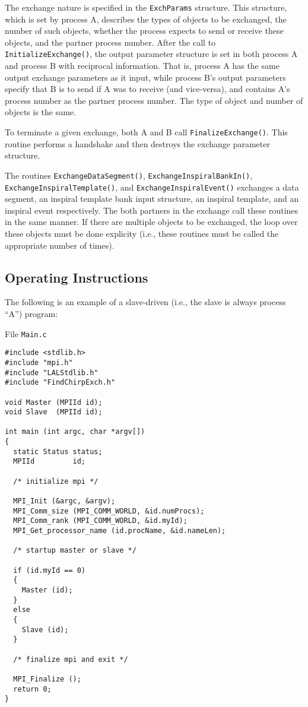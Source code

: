 \documentclass{article}
\begin{document}
The exchange nature is specified in the \verb+ExchParams+ structure.  This
structure, which is set by process A, describes the types of objects to be
exchanged, the number of such objects, whether the process expects to send or
receive these objects, and the partner process number.  After the call to
\verb+InitializeExchange()+, the output parameter structure is set in both
process A and process B with reciprocal information.  That is, process A has
the same output exchange parameters as it input, while process B's output
parameters specify that B is to send if A was to receive (and vice-versa), and
contains A's process number as the partner process number.  The type of object
and number of objects is the same.

To terminate a given exchange, both A and B call \verb+FinalizeExchange()+.
This routine performs a handshake and then destroys the exchange parameter
structure.

The routines \verb+ExchangeDataSegment()+, \verb+ExchangeInspiralBankIn()+,
\verb+ExchangeInspiralTemplate()+, and \verb+ExchangeInspiralEvent()+
exchanges a data segment, an inspiral template bank input structure, an
inspiral template, and an inspiral event respectively.  The both partners in
the exchange call these routines in the same manner.  If there are multiple
objects to be exchanged, the loop over these objects must be done explicity
(i.e., these routines must be called the appropriate number of times).


\subsection{Operating Instructions}

The following is an example of a slave-driven (i.e., the slave is always
process ``A'') program:

File \verb+Main.c+
\begin{verbatim}
#include <stdlib.h>
#include "mpi.h"
#include "LALStdlib.h"
#include "FindChirpExch.h"

void Master (MPIId id);
void Slave  (MPIId id);

int main (int argc, char *argv[])
{
  static Status status;
  MPIId         id;

  /* initialize mpi */

  MPI_Init (&argc, &argv);
  MPI_Comm_size (MPI_COMM_WORLD, &id.numProcs);
  MPI_Comm_rank (MPI_COMM_WORLD, &id.myId);
  MPI_Get_processor_name (id.procName, &id.nameLen);

  /* startup master or slave */

  if (id.myId == 0)
  {
    Master (id);
  }
  else
  {
    Slave (id);
  }

  /* finalize mpi and exit */

  MPI_Finalize ();
  return 0;
}
\end{verbatim}
\end{document}
